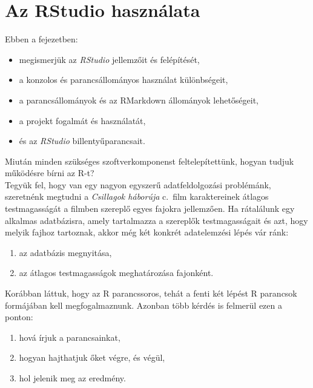 \documentclass[
]{book}
\makeatletter
\providecommand{\tightlist}{%
  \setlength{\itemsep}{0pt}\setlength{\parskip}{0pt}}
\newenvironment{kframe}{%
\medskip{}
\setlength{\fboxsep}{.8em}
 \def\at@end@of@kframe{}%
 \ifinner\ifhmode%
  \def\at@end@of@kframe{\end{minipage}}%
  \begin{minipage}{\columnwidth}%
 \fi\fi%
 \def\FrameCommand##1{\hskip\@totalleftmargin \hskip-\fboxsep
 \colorbox{shadecolor}{##1}\hskip-\fboxsep
     \hskip-\linewidth \hskip-\@totalleftmargin \hskip\columnwidth}%
 \MakeFramed {\advance\hsize-\width
   \@totalleftmargin\z@ \linewidth\hsize
   \@setminipage}}%
 {\par\unskip\endMakeFramed%
 \at@end@of@kframe}
\newenvironment{rmdblock}[1]
  {
  \begin{itemize}
  \renewcommand{\labelitemi}{
    \raisebox{-.7\height}[0pt][0pt]{
      {\setkeys{Gin}{width=3em,keepaspectratio}\texttt{[image: images/\#1]}}
    }
  }
  \setlength{\fboxsep}{1em}
  \begin{kframe}
  \item
  }
  {
  \end{kframe}
  \end{itemize}
  }
\newenvironment{rmdlevel1}
  {\begin{rmdblock}{level1}}
  {\end{rmdblock}}
\makeatother
\begin{document}
\hypertarget{AzRStudiohasznalata}{%
\section{Az RStudio használata}\label{AzRStudiohasznalata}}

\begin{rmdlevel1}
Ebben a fejezetben:

\begin{itemize}
\tightlist
\item
  megismerjük az \emph{RStudio} jellemzőit és felépítését,
\item
  a konzolos és parancsállományos használat különbségeit,
\item
  a parancsállományok és az RMarkdown állományok lehetőségeit,
\item
  a projekt fogalmát és használatát,
\item
  és az \emph{RStudio} billentyűparancsait.
\end{itemize}
\end{rmdlevel1}

Miután minden szükséges szoftverkomponenst feltelepítettünk, hogyan tudjuk működésre bírni az R-t?\\
Tegyük fel, hogy van egy nagyon egyszerű adatfeldolgozási problémánk, szeretnénk megtudni a \emph{Csillagok háborúja} c.~film karaktereinek átlagos testmagasságát a filmben szereplő egyes fajokra jellemzően. Ha rátalálunk egy alkalmas adatbázisra, amely tartalmazza a szereplők testmagasságait és azt, hogy melyik fajhoz tartoznak, akkor még két konkrét adatelemzési lépés vár ránk:

\begin{enumerate}
\def\labelenumi{\arabic{enumi}.}
\tightlist
\item
  az adatbázis megnyitása,
\item
  az átlagos testmagasságok meghatározása fajonként.
\end{enumerate}

Korábban láttuk, hogy az R parancssoros, tehát a fenti két lépést R parancsok formájában kell megfogalmaznunk. Azonban több kérdés is felmerül ezen a ponton:

\begin{enumerate}
\def\labelenumi{\arabic{enumi}.}
\tightlist
\item
  hová írjuk a parancsainkat,
\item
  hogyan hajthatjuk őket végre, és végül,
\item
  hol jelenik meg az eredmény.
\end{enumerate}
\end{document}
